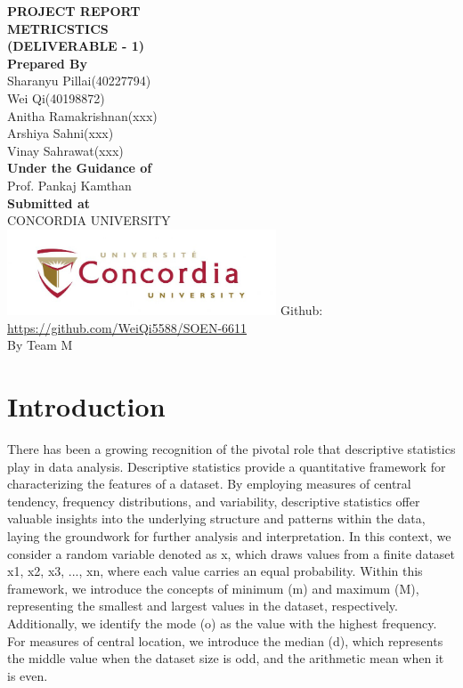 \documentclass[english,12pt,a4paper]{report}
\begin{document}
	\begin{titlepage}
		\centering
		\Huge
		\textbf{PROJECT REPORT}\\
		\vspace{1cm}
		\textbf{METRICSTICS}\\
		\textbf{(DELIVERABLE - 1)}\\
		\vspace{1.5cm}
		\Large
		\textbf{Prepared By}\\
		\vspace{0.5cm}
		Sharanyu Pillai(40227794)\\
		Wei Qi(40198872)\\
		Anitha Ramakrishnan(xxx)\\
		Arshiya Sahni(xxx)\\
		Vinay Sahrawat(xxx)\\
		\vspace{1.5cm}
		\large
		\textbf{Under the Guidance of}\\
		Prof. Pankaj Kamthan \\
		\vspace{1.5cm}
		\textbf{Submitted at}\\
		CONCORDIA UNIVERSITY\\
		\centering
		\includegraphics[width=8cm]{concordia.jpg}
		\vfill
		Github:\\
		\url{https://github.com/WeiQi5588/SOEN-6611} \\
		By Team M
		\thispagestyle{empty} 
	\end{titlepage}
	
	\newpage 
	\setcounter{page}{0}
	\tableofcontents
	\clearpage
	
	

	
	\chapter{Introduction}

	 There has been a growing recognition of the pivotal role that descriptive statistics play in data analysis. Descriptive statistics provide a quantitative framework for characterizing the features of a dataset. By employing measures of central tendency, frequency distributions, and variability, descriptive statistics offer valuable insights into the underlying structure and patterns within the data, laying the groundwork for further analysis and interpretation. In this context, we consider a random variable denoted as x, which draws values from a finite dataset {x1, x2, x3, ..., xn}, where each value carries an equal probability. Within this framework, we introduce the concepts of minimum (m) and maximum (M), representing the smallest and largest values in the dataset, respectively. Additionally, we identify the mode (o) as the value with the highest frequency. For measures of central location, we introduce the median (d), which represents the middle value when the dataset size is odd, and the arithmetic mean when it is even.
\end{document}
